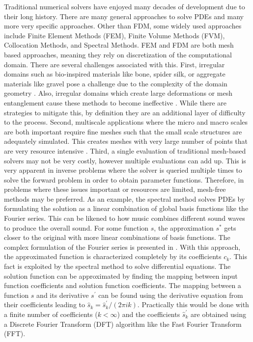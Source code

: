 Traditional numerical solvers have enjoyed many decades of development due to their long history. There are many general approaches to solve PDEs and many more very specific approaches. Other than FDM, some widely used approaches include Finite Element Methods (FEM), Finite Volume Methods (FVM), Collocation Methods, and Spectral Methods. FEM and FDM are both mesh based approaches, meaning they rely on discretization of the computational domain. There are several challenges associated with this. First, irregular domains such as bio-inspired materials like bone, spider silk, or aggregate materials like gravel pose a challenge due to the complexity of the domain geometry \autocite{gaulSimulationWavePropagation1991,buoniEfficientScalableNumerical2007,jiaModulateStressDistribution2024}. Also, irregular domains which create large deformations or mesh entanglement cause these methods to become ineffective \autocite{chenMeshfreeMethodsProgress2017}. While there are strategies to mitigate this, by definition they are an additional layer of difficulty to the process. Second, multiscale applications where the micro and macro scales are both important require fine meshes such that the small scale structures are adequately simulated. This creates meshes with very large number of points that are very resource intensive \autocite{buoniEfficientScalableNumerical2007}. Third, a single evaluation of traditional mesh-based solvers may not be very costly, however multiple evaluations can add up. This is very apparent in inverse problems where the solver is queried multiple times to solve the forward problem in order to obtain parameter functions. Therefore, in problems where these issues important or resources are limited, mesh-free methods may be preferred. As an example, the spectral method solves PDEs by formulating the solution as a linear combination of global basis functions like the Fourier series. This can be likened to how music combines different sound waves to produce the overall sound. For some function \(s\), the approximation \(s^*\) gets closer to the original with more linear combinations of basis functions. The complex formulation of the Fourier series is presented in . With this approach, the approximated function is characterized completely by its coefficients \(c_k\). This fact is exploited by the spectral method to solve differential equations. The solution function can be approximated by finding the mapping between input function coefficients and solution function coefficients. The mapping between a function \(s\) and its derivative \(s^{\prime}\) can be found using the derivative equation from their coefficients leading to \(\hat{s}_k = \hat{s}^{\prime}_k/\left(2\pi ik\right)\). Practically this would be done with a finite number of coefficients (\(k < \infty \)) and the coefficients \(\hat{s}^{\prime}_k\) are obtained using a Discrete Fourier Transform (DFT) algorithm like the Fast Fourier Transform (FFT).
